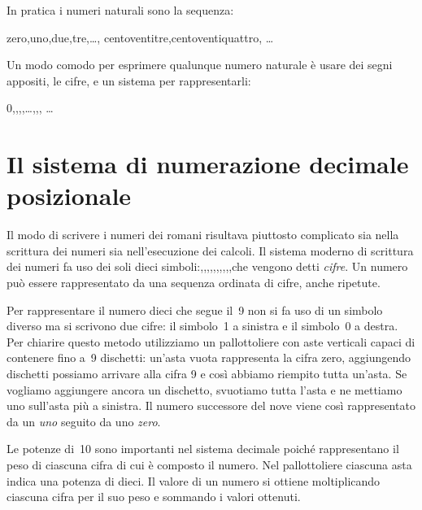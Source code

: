 In pratica i numeri naturali sono la sequenza:

zero,\quad uno,\quad due,\quad tre,\quad \dots,\quad
centoventitre,\quad centoventiquattro,\quad 
\dots

Un modo comodo per esprimere qualunque numero naturale è usare dei segni 
appositi, le cifre, e un sistema per rappresentarli:

 0,,,,\quad \dots,,, \dots

\section{Il sistema di numerazione decimale posizionale}
\label{sec:nat_sist10}

Il modo di scrivere i numeri dei romani risultava piuttosto complicato sia 
nella scrittura dei numeri sia nell'esecuzione dei calcoli. 
Il sistema moderno di scrittura dei numeri fa uso dei soli dieci 
simboli:,,,,,,,,,,\quad che vengono detti \emph{cifre}.
Un numero può essere rappresentato da una sequenza ordinata di cifre, 
anche ripetute.

Per rappresentare il numero dieci che segue il~9 non si fa uso di un 
simbolo diverso ma si scrivono due cifre: il simbolo~1 a sinistra e il 
simbolo~0 a destra. 
Per chiarire questo metodo utilizziamo un pallottoliere con aste 
verticali capaci di contenere fino a~9 dischetti: 
un'asta vuota rappresenta la cifra zero, aggiungendo dischetti possiamo 
arrivare alla cifra 9 e così abbiamo riempito tutta un'asta. 
Se vogliamo aggiungere ancora un dischetto, svuotiamo tutta l'asta e ne 
mettiamo uno sull'asta più a sinistra.
Il numero successore del nove viene così rappresentato da un \emph{uno} 
seguito da uno \emph{zero}.


Le potenze di~10 sono importanti nel sistema decimale poiché rappresentano 
il peso di ciascuna cifra di cui è composto il numero. 
Nel pallottoliere ciascuna asta indica una potenza di dieci. 
Il valore di un numero si ottiene moltiplicando ciascuna cifra per il
suo peso e sommando i valori ottenuti.

